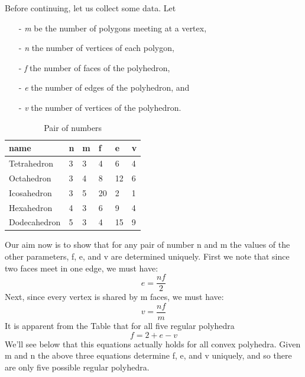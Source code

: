 \documentclass[openany,a4paper,12pt]{book}
\begin{document}
\newpage
Before continuing, let us collect some data. Let
\begin{itemize}
\item[-]
\textit{m} be the number of polygons meeting at a vertex,
\item[-]
\textit{n} the number of vertices of each polygon,
\item[-]
\textit{f} the number of faces of the polyhedron,
\item[-]
\textit{e} the number of edges of the polyhedron, and
\item[-]
\textit{v} the number of vertices of the polyhedron.
\end{itemize}

\begin{table}[H]
\begin{center}
\caption{Pair of numbers} 
\begin{tabular}{|p{2.5cm}|p{1cm}|p{1cm}|p{1cm}|p{1cm}|p{1cm}|}
\hline
    name & n & m & f & e & v \\ \hline
    Tetrahedron & 3 & 3 & 4 & 6 & 4  \\
    Octahedron & 3 & 4 & 8 & 12 & 6\\
    Icosahedron & 3 & 5 & 20 & 2 & 1 \\
    Hexahedron & 4 & 3& 6 & 9 & 4 \\
    Dodecahedron & 5 & 3 & 4 & 15 & 9 \\ \hline
\end{tabular}
\end{center}
\end{table}

Our aim now is to show that for any pair of number n and m the values of the other parameters, f, e, and v are determined uniquely. First we note that since two faces meet in one edge, we must have: 
\begin {equation}
e=\frac{nf}{2}
\end {equation}
Next, since every vertex is shared by m faces, we must have: 
\begin {equation}
v=\frac{nf}{m}
\end {equation}
It is apparent from the Table that for all five regular polyhedra
\begin {equation}
f=2+e-v
\end {equation}
We'll see below that this equations actually holds for all convex polyhedra. Given m and n the above three equations determine f, e, and v uniquely, and so there are only five possible regular polyhedra.
\newpage
\end{document}
